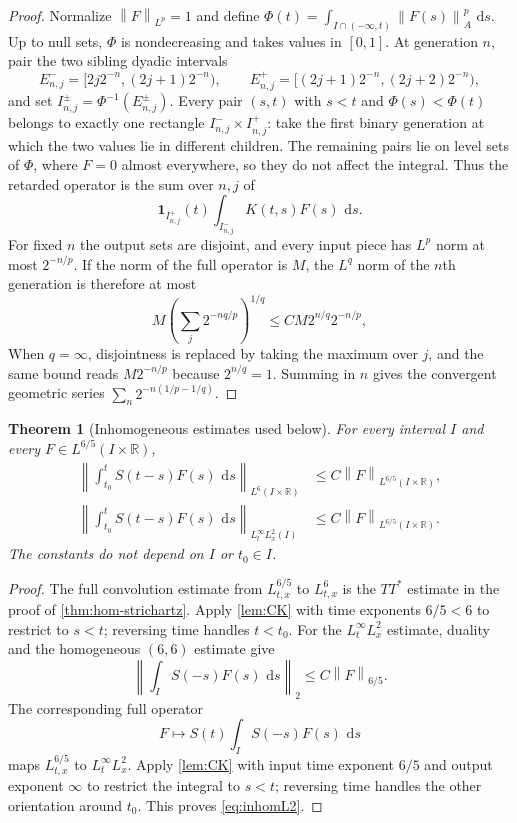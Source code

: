 \documentclass[11pt,oneside]{book}
\newtheorem{theorem}{Theorem}[chapter]
\theoremstyle{definition}
\theoremstyle{remark}
\newcommand{\R}{\mathbb R}
\newcommand{\1}{\mathbf 1}
\newcommand{\dd}{\,\mathrm d}
\newcommand{\norm}[1]{\left\lVert #1\right\rVert}
\begin{document}
\begin{proof}
Normalize $\norm F_{L^p}=1$ and define
$\Phi(t)=\int_{I\cap(-\infty,t)}\norm{F(s)}_A^p\,\dd s$.  Up to null sets,
$\Phi$ is nondecreasing and takes values in $[0,1]$.  At generation $n$,
pair the two sibling dyadic intervals
\[
 E^-_{n,j}=[2j2^{-n},(2j+1)2^{-n}),
 \qquad
 E^+_{n,j}=[(2j+1)2^{-n},(2j+2)2^{-n}),
\]
and set $I^\pm_{n,j}=\Phi^{-1}(E^\pm_{n,j})$.  Every pair
$(s,t)$ with $s<t$ and $\Phi(s)<\Phi(t)$ belongs to exactly one rectangle
$I^-_{n,j}\times I^+_{n,j}$: take the first binary generation at which the
two values lie in different children.  The remaining pairs lie on level sets
of $\Phi$, where $F=0$ almost everywhere, so they do not affect the integral.
Thus the retarded operator is the sum over $n,j$ of
\[
 \1_{I^+_{n,j}}(t)
 \int_{I^-_{n,j}}K(t,s)F(s)\,\dd s.
\]
For fixed $n$ the output sets are disjoint, and every input piece has
$L^p$ norm at most $2^{-n/p}$.  If the norm of the full operator is $M$, the
$L^q$ norm of the $n$th generation is therefore at most
\[
 M\left(\sum_j 2^{-nq/p}\right)^{1/q}
 \le CM2^{n/q}2^{-n/p},
\]
When $q=\infty$, disjointness is replaced by taking the maximum over $j$,
and the same bound reads $M2^{-n/p}$ because $2^{n/q}=1$.  Summing in $n$
gives the convergent geometric series
$\sum_n2^{-n(1/p-1/q)}$.
\end{proof}

\begin{theorem}[Inhomogeneous estimates used below]\label{thm:inhom-str}
For every interval $I$ and every $F\in L^{6/5}(I\times\R)$,
\begin{align}
 \left\|\int_{t_0}^tS(t-s)F(s)\,\dd s\right\|_{L^6(I\times\R)}
 &\le C\norm F_{L^{6/5}(I\times\R)},                 \label{eq:inhom66}\\
 \left\|\int_{t_0}^tS(t-s)F(s)\,\dd s\right\|_{L^\infty_tL^2_x(I)}
 &\le C\norm F_{L^{6/5}(I\times\R)}.               \label{eq:inhomL2}
\end{align}
The constants do not depend on $I$ or $t_0\in I$.
\end{theorem}

\begin{proof}
The full convolution estimate from $L^{6/5}_{t,x}$ to $L^6_{t,x}$ is the
$TT^*$ estimate in the proof of \cref{thm:hom-strichartz}.  Apply
\cref{lem:CK} with time exponents $6/5<6$ to restrict to $s<t$; reversing
time handles $t<t_0$.  For the $L^\infty_tL^2_x$ estimate, duality and the
homogeneous $(6,6)$ estimate give
\[
 \left\|\int_I S(-s)F(s)\,\dd s\right\|_2
 \le C\norm F_{6/5}.
\]
The corresponding full operator
\[
 F\longmapsto S(t)\int_I S(-s)F(s)\,\dd s
\]
maps $L^{6/5}_{t,x}$ to $L^\infty_tL^2_x$.  Apply
\cref{lem:CK} with input time exponent $6/5$ and output exponent $\infty$
to restrict the integral to $s<t$; reversing time handles the other
orientation around $t_0$.  This proves \eqref{eq:inhomL2}.
\end{proof}
\end{document}
